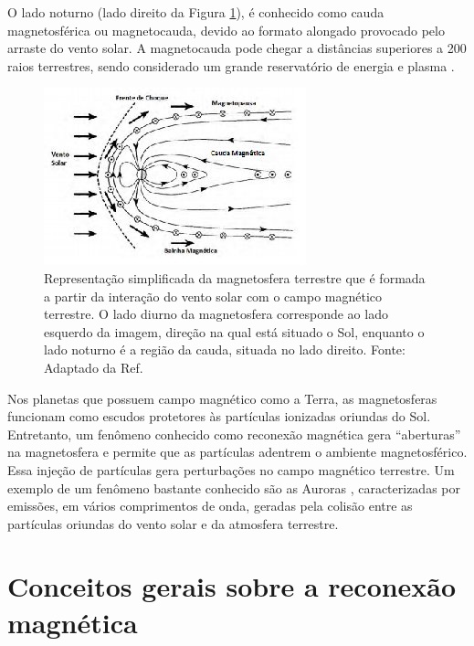 O lado noturno (lado direito da Figura \ref{magnetosfera}), é conhecido como cauda magnetosférica ou magnetocauda, devido ao formato alongado provocado pelo arraste do vento solar. A magnetocauda pode chegar a distâncias superiores a 200 raios terrestres, sendo considerado um grande reservatório de energia e plasma \cite{russell2001,sibeck2014,ezequiel2006}.

\begin{figure}
	\begin{center}
		\includegraphics[scale=0.8]{magnetosfera.jpg}
		\caption[Fig]{Representação simplificada da magnetosfera terrestre que é formada a partir da interação do vento solar com o campo magnético terrestre. O lado diurno da magnetosfera corresponde ao lado esquerdo da imagem, direção na qual está situado o Sol, enquanto o lado noturno é a região da cauda, situada no lado direito. Fonte: Adaptado da Ref. \cite{elphic1979}}
		\label{magnetosfera}
	\end{center}
\end{figure}

Nos planetas que possuem campo magnético como a Terra, as magnetosferas funcionam como escudos protetores às partículas ionizadas oriundas do Sol. Entretanto, um fenômeno conhecido como reconexão magnética gera ``aberturas'' na magnetosfera e permite que as partículas adentrem o ambiente magnetosférico. Essa injeção de partículas gera perturbações no campo magnético terrestre. Um exemplo de um fenômeno bastante conhecido são as Auroras \cite{da2015,costa2011,souza2016,kivelson1995,baumjohann1996}, caracterizadas por emissões, em vários comprimentos de onda, geradas pela colisão entre as partículas oriundas do vento solar e da atmosfera terrestre.  


\section{Conceitos gerais sobre a reconexão magnética}

